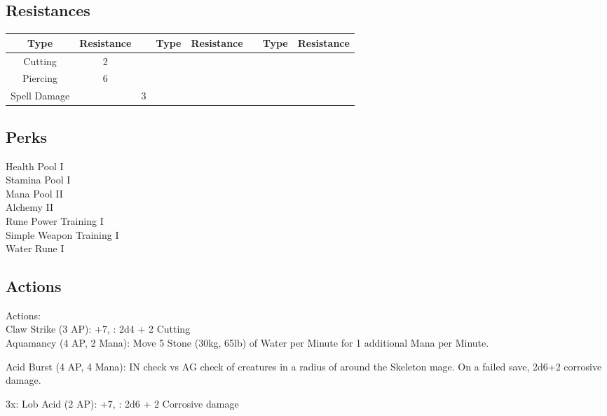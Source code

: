 \subsection{Resistances}
\begin{minipage}[H]{1\textwidth}
    \centering
    \begin{tabular}[c]{|c | c | c | c | c | c | c | c|}
        \hline
        Type & Resistance && Type & Resistance && Type & Resistance\\
        \hline
        Cutting & 2 \\
        Piercing & 6\\
        Spell Damage && 3\\
        \hline
    \end{tabular}
\end{minipage}

\subsection{Perks}
Health Pool I\\
Stamina Pool I\\
Mana Pool II\\
Alchemy II\\
Rune Power Training I\\
Simple Weapon Training I\\
Water Rune I\\

\subsection{Actions}
Actions:\\
Claw Strike (3 AP): +7, : 2d4 + 2 Cutting\\

Aquamancy (4 AP, 2 Mana): Move 5 Stone (30kg, 65lb) of Water per Minute for 1 additional Mana per Minute.

Acid Burst (4 AP, 4 Mana): IN check vs AG check of creatures in a radius of  around the Skeleton mage.
On a failed save, 2d6+2 corrosive damage.

3x: Lob Acid (2 AP): +7, : 2d6 + 2 Corrosive damage\\

